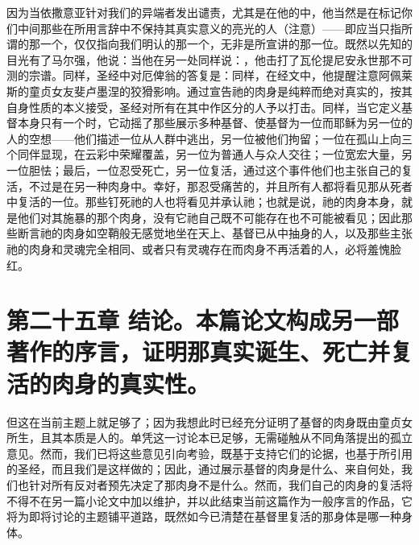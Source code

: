 因为当依撒意亚针对我们的异端者发出谴责，尤其是在他的中，他当然是在标记你们中间那些在所用言辞中不保持其真实意义的亮光的人（注意）——即应当只指所谓的那一个，仅仅指向我们明认的那一个，无非是所宣讲的那一位。既然以先知的目光有了马尔强，他说：当他在另一处同样说：，他击打了瓦伦提尼安永世那不可测的宗谱。同样，圣经中对厄俾翁的答复是：同样，在经文中，他提醒注意阿佩莱斯的童贞女友斐卢墨涅的狡猾影响。通过宣告祂的肉身是纯粹而绝对真实的，按其自身性质的本义接受，圣经对所有在其中作区分的人予以打击。同样，当它定义基督本身只有一个时，它动摇了那些展示多种基督、使基督为一位而耶稣为另一位的人的空想——他们描述一位从人群中逃出，另一位被他们拘留；一位在孤山上向三个同伴显现，在云彩中荣耀覆盖，另一位为普通人与众人交往；一位宽宏大量，另一位胆怯；最后，一位忍受死亡，另一位复活，通过这个事件他们也主张自己的复活，不过是在另一种肉身中。幸好，那忍受痛苦的，并且所有人都将看见那从死者中复活的一位。那些钉死祂的人也将看见并承认祂；也就是说，祂的肉身本身，就是他们对其施暴的那个肉身，没有它祂自己既不可能存在也不可能被看见；因此那些断言祂的肉身如空鞘般无感觉地坐在天上、基督已从中抽身的人，以及那些主张祂的肉身和灵魂完全相同、或者只有灵魂存在而肉身不再活着的人，必将羞愧脸红。\par


\section{第二十五章 结论。本篇论文构成另一部著作的序言，证明那真实诞生、死亡并复活的肉身的真实性。}

但这在当前主题上就足够了；因为我想此时已经充分证明了基督的肉身既由童贞女所生，且其本质是人的。单凭这一讨论本已足够，无需碰触从不同角落提出的孤立意见。然而，我们已将这些意见引向考验，既基于支持它们的论据，也基于所引用的圣经，而且我们是这样做的；因此，通过展示基督的肉身是什么、来自何处，我们也针对所有反对者预先决定了那肉身不是什么。然而，我们自己的肉身的复活将不得不在另一篇小论文中加以维护，并以此结束当前这篇作为一般序言的作品，它将为即将讨论的主题铺平道路，既然如今已清楚在基督里复活的那身体是哪一种身体。\par

